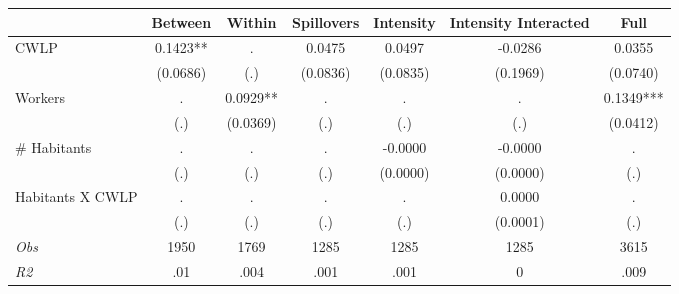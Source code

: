 \begin{tabular}{l*{6}{c}}\hline&\multicolumn{1}{c}{Between}&\multicolumn{1}{c}{Within}&\multicolumn{1}{c}{Spillovers}&\multicolumn{1}{c}{Intensity}&\multicolumn{1}{c}{Intensity Interacted}&\multicolumn{1}{c}{Full}\\ \hline 
CWLP & 0.1423** & . & 0.0475 & 0.0497 & -0.0286 & 0.0355 \\
 & (0.0686) & (.) & (0.0836) & (0.0835) & (0.1969) & (0.0740) \\
Workers & . & 0.0929** & . & . & . & 0.1349*** \\
 & (.) & (0.0369) & (.) & (.) & (.) & (0.0412) \\
\# Habitants & . & . & . & -0.0000 & -0.0000 & . \\
 & (.) & (.) & (.) & (0.0000) & (0.0000) & (.) \\
Habitants X CWLP & . & . & . & . & 0.0000 & . \\
 & (.) & (.) & (.) & (.) & (0.0001) & (.) \\
\hline \textit{Obs} & 1950 & 1769 & 1285 & 1285 & 1285 & 3615 \\ \textit{R2} & .01 & .004 & .001 & .001 & 0 & .009 \\ \hline \end{tabular}
